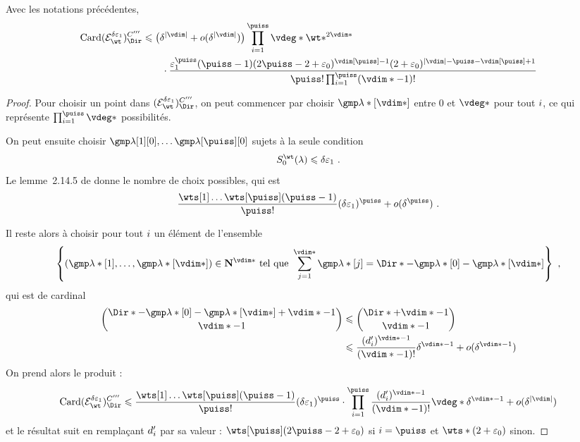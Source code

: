 \begin{lem}
  Avec les notations précédentes,
  \begin{align}
    \card (\stairs)\Ciii
    & \le
    \bigl(\delta^{\lgr\vdim} + o(\delta^{\lgr\vdim})\bigr)
    \prod\fctrange \vdeg* \wt*^{2\vdim*}
    \\ & \qquad \cdot
    \frac {
      \epsi^\puiss (\puiss-1)
      (2\puiss - 2 + \epsz) ^{\vdim[\puiss]-1}
      (2 + \epsz) ^{\lgr\vdim - \puiss - \vdim[\puiss] + 1}
      }{
      \puiss! \prod\fctrange (\vdim* - 1)!
      }
  \end{align}
\end{lem}

\begin{proof}
  Pour choisir un point dans \( (\stairs)\Ciii \), on peut commencer par
  choisir \( \imp*[\vdim*] \) entre \( 0 \) et \( \vdeg* \)
  pour tout \( i \), ce qui représente \( \prod\fctrange \vdeg* \)
  possibilités.

  On peut ensuite choisir \( \imp[1][0], \dots \imp[\puiss][0] \)
  sujets à la seule condition
  \begin{equation}
    \wtsum*(\lambda) \le \delta \epsi \pmm.
  \end{equation}
  Le lemme~2.14.5 de \cite{farhith} donne le nombre de choix possibles, qui
  est
  \begin{equation}
    \frac {\prodwt} {\puiss !} (\delta\epsi)^\puiss
    + o(\delta^\puiss)
    \pmm.
  \end{equation}

  Il reste alors à choisir pour tout \( i \) un élément de l'ensemble
  \begin{equation}
    \left\{
      (\imp*[1],  \dots, \imp*[\vdim*])
      \in \N ^{\vdim*}
      \text{ tel que }
      \sum_{j=1}^{\vdim*} \imp*[j]
      =
      \Dir* - \imp*[0] - \imp*[\vdim*]
    \right\}
    \pmm,
  \end{equation}
  qui est de cardinal
  \begin{align}
    \binom {
      \Dir* - \imp*[0] - \imp*[\vdim*] + \vdim* - 1
      }{
      \vdim* - 1
      }
    & \le
    \binom {
      \Dir* + \vdim* - 1
      }{
      \vdim* - 1
      }
    \\
    & \le
    \frac {(d'_\fct)^{\vdim* - 1}} {(\vdim* - 1)!} \delta^{\vdim* - 1}
    + o( \delta^{\vdim* - 1} )
  \end{align}
  On prend alors le produit :
  \begin{equation}
    \card (\stairs)\Ciii
    \le
    \frac {\prodwt} {\puiss !} (\delta\epsi)^\puiss
    \cdot \prod\fctrange
    \frac {(d'_\fct)^{\vdim* - 1}} {(\vdim* - 1)!}
    \vdeg* \delta^{\vdim* - 1}
    + o( \delta^{\lgr\vdim} )
  \end{equation}
  et le résultat suit en remplaçant \( d'_i \) par sa valeur : \(
    \wts[\puiss] (2\puiss - 2 + \epsz) \) si \( \fct = \puiss \) et \( \wts*
    (2 + \epsz) \) sinon.
\end{proof}

